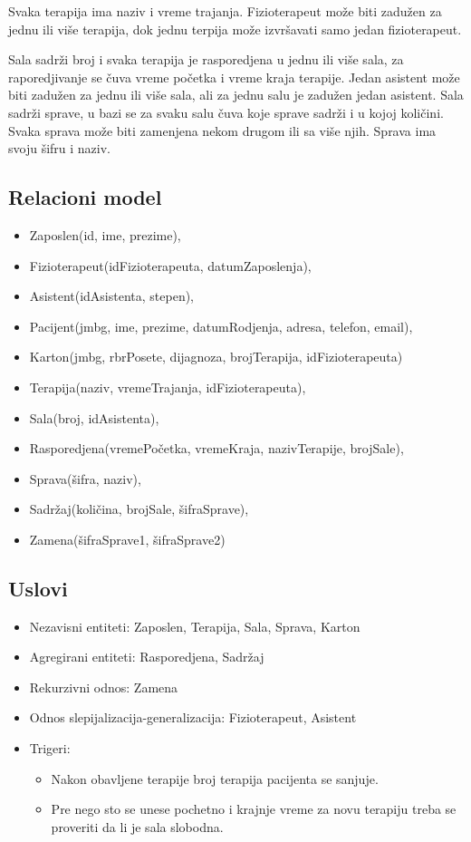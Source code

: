 \documentclass{article}
\begin{document}
Svaka terapija ima naziv i vreme trajanja. Fizioterapeut može biti zadužen za jednu ili više terapija, dok jednu terpija može izvršavati samo jedan fizioterapeut.

Sala sadrži broj i svaka terapija je rasporedjena u jednu ili više sala, za raporedjivanje se čuva vreme početka i vreme kraja terapije. Jedan asistent može biti zadužen za jednu ili više sala, ali za jednu salu je zadužen jedan asistent. Sala sadrži sprave, u bazi se za svaku salu čuva koje sprave sadrži i u kojoj količini. Svaka sprava može biti zamenjena nekom drugom ili sa više njih. Sprava ima svoju šifru i naziv.

\subsection{Relacioni model}
\begin{itemize} 
	\item Zaposlen(id, ime, prezime),
	\item Fizioterapeut(idFizioterapeuta, datumZaposlenja),
	\item Asistent(idAsistenta, stepen),
	\item Pacijent(jmbg, ime, prezime, datumRodjenja, adresa, telefon, email),
	\item Karton(jmbg, rbrPosete, dijagnoza, brojTerapija, idFizioterapeuta)
	\item Terapija(naziv, vremeTrajanja, idFizioterapeuta),
	\item Sala(broj, idAsistenta),
	\item Rasporedjena(vremePočetka, vremeKraja, nazivTerapije, brojSale),
	\item Sprava(šifra, naziv),
	\item Sadržaj(količina, brojSale, šifraSprave),
	\item Zamena(šifraSprave1, šifraSprave2)
\end{itemize}

\subsection{Uslovi}
\begin{itemize}
	\item Nezavisni entiteti: Zaposlen, Terapija, Sala, Sprava, Karton
	\item Agregirani entiteti: Rasporedjena, Sadržaj
	\item Rekurzivni odnos: Zamena
	\item Odnos slepijalizacija-generalizacija: Fizioterapeut, Asistent
	\item Trigeri: 
		\begin{itemize}
			\item Nakon obavljene terapije broj terapija pacijenta se sanjuje.
			\item Pre nego sto se unese pochetno i krajnje vreme za novu terapiju treba se proveriti da li je sala slobodna.
		\end{itemize}	
\end{itemize}
\end{document}
